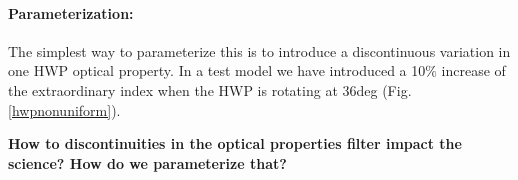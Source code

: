 \paragraph{Parameterization:}
The simplest way to parameterize this is to introduce a discontinuous variation in one HWP optical property. In a test model we have introduced a 10$\%$ increase of the extraordinary index when the HWP
is rotating at 36deg (Fig.\,\ref{hwpnonuniform}). 


\textbf{How to discontinuities in the optical properties filter impact the science? How do we parameterize that?}
